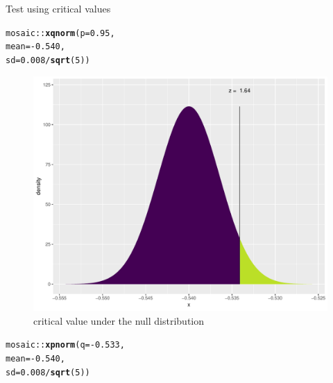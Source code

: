 \documentclass[handout]{beamer}\usepackage[]{graphicx}\usepackage[]{color}
\newcommand{\hlnum}[1]{\textcolor[rgb]{0.686,0.059,0.569}{#1}}%
\newcommand{\hlopt}[1]{\textcolor[rgb]{0,0,0}{#1}}%
\newcommand{\hlstd}[1]{\textcolor[rgb]{0.345,0.345,0.345}{#1}}%
\newcommand{\hlkwc}[1]{\textcolor[rgb]{0.333,0.667,0.333}{#1}}%
\newcommand{\hlkwd}[1]{\textcolor[rgb]{0.737,0.353,0.396}{\textbf{#1}}}%
\newenvironment{knitrout}{}{} %
\begin{document}
\begin{frame}[fragile]{Test using critical values}


	\begin{minipage}{0.47\textwidth}
\begin{knitrout}\scriptsize
{}\color{fgcolor}
\begin{alltt}
\hlstd{mosaic}\hlopt{::}\hlkwd{xqnorm}\hlstd{(}\hlkwc{p} \hlstd{=} \hlnum{0.95}\hlstd{,}
\hlkwc{mean} \hlstd{=} \hlopt{-}\hlnum{0.540}\hlstd{,}
\hlkwc{sd} \hlstd{=} \hlnum{0.008}\hlopt{/}\hlkwd{sqrt}\hlstd{(}\hlnum{5}\hlstd{))}
\end{alltt}
\begin{figure}

{\centering \includegraphics[width=1\linewidth]{figure/unnamed-chunk-4-1} 

}

\caption[critical value under the null distribution]{critical value under the null distribution}\label{fig:unnamed-chunk-4}
\end{figure}


\end{knitrout}
	\end{minipage}
	\begin{minipage}{0.47\textwidth}
\begin{knitrout}\scriptsize
{}\color{fgcolor}
\begin{alltt}
\hlstd{mosaic}\hlopt{::}\hlkwd{xpnorm}\hlstd{(}\hlkwc{q} \hlstd{=} \hlopt{-}\hlnum{0.533}\hlstd{,}
\hlkwc{mean} \hlstd{=} \hlopt{-}\hlnum{0.540}\hlstd{,}
\hlkwc{sd} \hlstd{=} \hlnum{0.008}\hlopt{/}\hlkwd{sqrt}\hlstd{(}\hlnum{5}\hlstd{))}
\end{alltt}
\begin{figure}


\end{figure}
\end{knitrout}
\end{minipage}
\end{frame}
\end{document}
